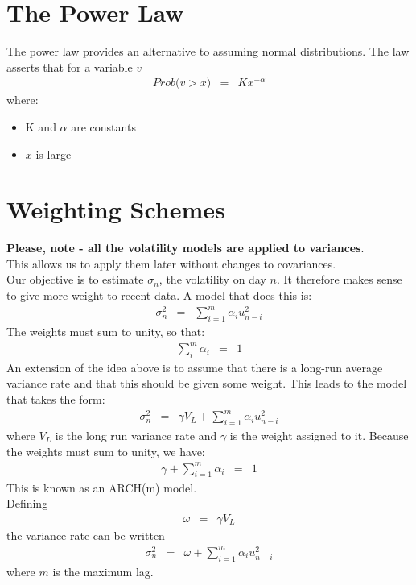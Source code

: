 \section{The Power Law}
The power law provides an alternative to assuming normal distributions. The law asserts that for a variable $v$
\begin{eqnarray}
	Prob\big(v > x\big) &=& Kx^{-\alpha}
\end{eqnarray}
where:
\begin{itemize}
	\item K and $\alpha$ are constants
	\item $x$ is large
\end{itemize}

\section{Weighting Schemes}
\textbf{\color{blue}Please, note - all the volatility models are applied to variances}.\\
This allows us to apply them later without changes to covariances.\\
Our objective is to estimate $\sigma_{n}$, the volatility on day $n$. It therefore makes sense to give more weight to recent data. A model that does this is:
\begin{eqnarray}
	\sigma_{n}^{2} &=& \sum_{i = 1}^{m}\alpha_{i}u_{n - i}^{2}
\end{eqnarray}
The weights must sum to unity, so that:
\begin{eqnarray}
	\sum_{i}^{m}\alpha_{i} &=& 1
\end{eqnarray}
An extension of the idea above is to assume that there is a long-run average variance rate and that this should be given some weight. This leads to the model that takes the form:
\begin{eqnarray}
	\sigma_{n}^{2} &=& \gamma V_{L} + \sum_{i = 1}^{m}\alpha_{i}u_{n - i}^{2}
\end{eqnarray}
where $V_{L}$ is the long run variance rate and $\gamma$ is the weight assigned to it. Because the weights must sum to unity, we have:
\begin{eqnarray}
	\gamma + \sum_{i = 1}^{m}\alpha_{i} &=& 1
\end{eqnarray}
This is known as an ARCH(m) model.\\
Defining
\begin{eqnarray}
	\omega &=& \gamma V_{L}
\end{eqnarray}
the variance rate can be written
\begin{eqnarray}
	\sigma_{n}^{2} &=& \omega + \sum_{i = 1}^{m}\alpha_{i}u_{n - i}^{2}
\end{eqnarray}
where $m$ is the maximum lag.

